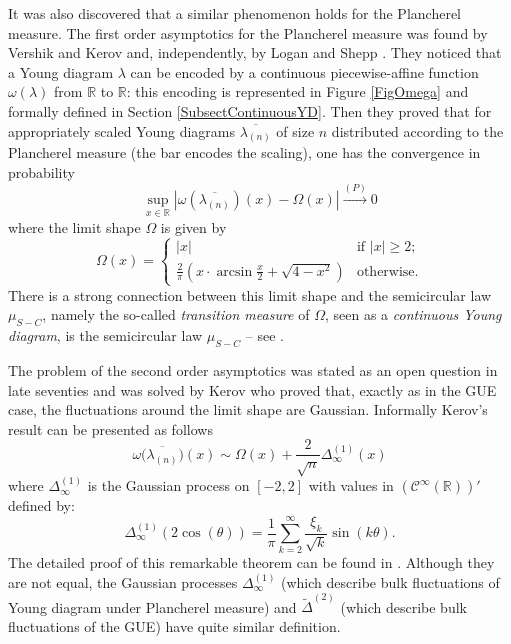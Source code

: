 \documentclass[11pt]{amsart}
\theoremstyle{plain}
\theoremstyle{remark}
\newcommand{\RR}{\mathbb{R}}
\begin{document}
It was also discovered that a similar phenomenon holds for the Plancherel measure.
The first order asymptotics for the Plancherel measure was found by Vershik and Kerov \cite{KerovVershikLimitYD} and, independently, by Logan and Shepp \cite{LoganShepp1977}.
They noticed that a Young diagram $\lambda$ can be encoded by a continuous piecewise-affine function $\omega(\lambda)$ from $\RR$ to $\RR$:
this encoding is represented in Figure \ref{FigOmega} and formally defined in Section \ref{SubsectContinuousYD}.
Then they proved that for appropriately scaled Young diagrams $\overline{\lambda_{(n)}}$ of size $n$
distributed according to the Plancherel measure (the bar encodes the scaling),
one has the convergence in probability
\[ \sup\limits_{x \in \RR} \left|\omega({\overline{\lambda_{(n)}}})(x) - \Omega(x) \right| \stackrel{(P)}{\longrightarrow} 0\]
where the limit shape $\Omega$ is given by
\begin{equation}\label{eq:DefOmega}
    \Omega(x) = \begin{cases}
    |x| & \text{if }|x| \geq 2;\\
    \frac{2}{\pi} \left( x \cdot \arcsin \frac{x}{2} + \sqrt{4-x^2} \right) 
    & \text{otherwise.}
\end{cases}
\end{equation}
There is a strong connection between this limit shape
and the semicircular law $\mu_{S-C}$, namely the so-called 
{\em transition measure} of $\Omega$,
seen as a {\em continuous Young diagram},
is the semicircular law $\mu_{S-C}$
-- see \cite[Section 1.2]{Biane1998}.

The problem of the second order asymptotics was stated as an open question in late seventies
and was solved by Kerov \cite{Kerov1993} who proved that, exactly as in the GUE case, the fluctuations around the limit shape are Gaussian.
Informally Kerov's result can be presented as follows
\[\omega\big({\overline{\lambda_{(n)}}}\big)(x) \sim \Omega(x) + \frac{2}{\sqrt{n}} \Delta^{(1)}_\infty(x)\]
where $\Delta^{(1)}_\infty$ is the Gaussian process on $[-2,2]$ with values in  $(\mathcal{C}^\infty(\RR))'$ defined by:
\[\Delta^{(1)}_\infty(2\cos(\theta)) =\frac{1}{\pi} \sum_{k=2}^\infty \frac{\xi_k}{\sqrt{k}} \sin(k \theta).\]
The detailed proof of this remarkable theorem can be found in \cite{IvanovOlshanski2002}.
Although they are not equal, the Gaussian processes
$\Delta^{(1)}_\infty$ (which describe bulk fluctuations of Young diagram under Plancherel measure)
and $\widetilde{\Delta}^{(2)}$ (which describe bulk fluctuations of the GUE)
have quite similar definition.
\end{document}
